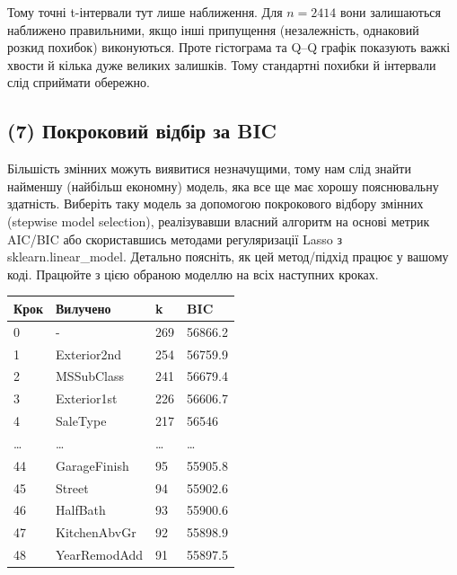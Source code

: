 Тому точні t-інтервали тут лише наближення. Для \(n=2414\) вони
залишаються наближено правильними, якщо інші припущення (незалежність,
однаковий розкид похибок) виконуються. Проте гістограма та Q--Q графік
показують важкі хвости й кілька дуже великих залишків. Тому стандартні
похибки й інтервали слід сприймати обережно.


\clearpage

\Needspace{225.0pt}

\subsection{(7) Покроковий відбір за BIC}

\begin{taskstatement}
Більшість змінних можуть виявитися незначущими, тому нам слід знайти
найменшу (найбільш економну) модель, яка все ще має хорошу пояснювальну
здатність. Виберіть таку модель за допомогою покрокового відбору змінних
(stepwise model selection), реалізувавши власний алгоритм на основі
метрик AIC/BIC або скориставшись методами регуляризації Lasso з
sklearn.linear\_model. Детально поясніть, як цей метод/підхід працює у
вашому коді. Працюйте з цією обраною моделлю на всіх наступних кроках.
\end{taskstatement}



\begingroup\fontsize{7.5}{9.5}\selectfont\setlength{\tabcolsep}{2.5mm}\renewcommand{\arraystretch}{1.15}
\par\vspace{2pt}\noindent\begin{tabular}{|llll|}
\hline
Крок & Вилучено & k & BIC \\
\hline
0 & - & 269 & 56866.2 \\
1 & Exterior2nd & 254 & 56759.9 \\
2 & MSSubClass & 241 & 56679.4 \\
3 & Exterior1st & 226 & 56606.7 \\
4 & SaleType & 217 & 56546 \\
… & … & … & … \\
44 & GarageFinish & 95 & 55905.8 \\
45 & Street & 94 & 55902.6 \\
46 & HalfBath & 93 & 55900.6 \\
47 & KitchenAbvGr & 92 & 55898.9 \\
48 & YearRemodAdd & 91 & 55897.5 \\
\hline
\end{tabular}\par\nopagebreak{}
\par\vspace{2pt}
\endgroup


